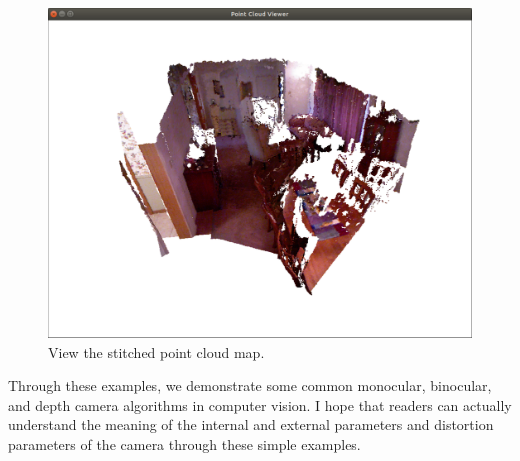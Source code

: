 \begin{figure}[!htp]
	\centering
	\includegraphics[width=1.0\textwidth]{chapter05/resources/cameraModel/pointcloud.pdf}
	\caption{View the stitched point cloud map. }
	\label{fig:pointcloudmapping}
\end{figure}

Through these examples, we demonstrate some common monocular, binocular, and depth camera algorithms in computer vision. I hope that readers can actually understand the meaning of the internal and external parameters and distortion parameters of the camera through these simple examples.
